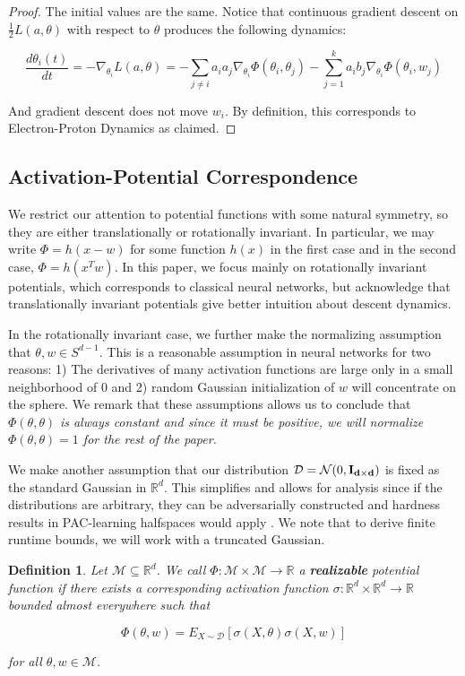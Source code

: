\documentclass[11pt]{article}
\newtheorem{definition}[theorem]{Definition}
\newcommand{\R}{{\mathbb{R}}}
\begin{document}
\begin{proof}
The initial values are the same. Notice that continuous gradient descent on $\frac{1}{2}L(a,\theta)$ with respect to $\theta$ produces the following dynamics:

\[\frac{d\theta_i(t)}{dt} = -\nabla_{\theta_i}L(a,\theta) = -\sum_{j \neq i} a_i a_j \nabla_{\theta_i}\Phi(\theta_i,\theta_j) - \sum_{j=1}^k a_ib_j\nabla_{\theta_i} \Phi(\theta_i,w_j)\]

And gradient descent does not move $w_i$. By definition, this corresponds to Electron-Proton Dynamics as claimed.
\end{proof}

\subsection{Activation-Potential Correspondence}

We restrict our attention to potential functions with some natural symmetry, so they are either translationally or rotationally invariant. In particular, we may write $\Phi= h(x-w)$ for some function $h(x)$  in the first case and in the second case, $\Phi = h(x^Tw)$. In this paper, we focus mainly on rotationally invariant potentials, which corresponds to classical neural networks, but acknowledge that translationally invariant potentials give better intuition about descent dynamics.

In the rotationally invariant case, we further make the normalizing assumption that $\theta, w \in S^{d-1}$. This is a reasonable assumption in neural networks for two reasons: 1) The derivatives of many activation functions are large only in a small neighborhood of 0 and 2) random Gaussian initialization of $w$ will concentrate on the sphere. We remark that these assumptions allows us to conclude that $\Phi(\theta,\theta)$ {\it is always constant and since it must be positive, we will normalize $\Phi(\theta,\theta) = 1$ for the rest of the paper.}

We make another assumption that our distribution $\mathcal{D} = \mathcal{N}(0, {\bf I_{d\times d}})$ is fixed as the standard Gaussian in $\R^d$. This simplifies and allows for analysis since if the distributions are arbitrary, they can be adversarially constructed and hardness results in PAC-learning halfspaces would apply \cite{klivans2006cryptographic}. We note that to derive finite runtime bounds, we will work with a truncated Gaussian.

\begin{definition}
Let $\mathcal{M} \subseteq \R^d$. We call $\Phi: \mathcal{M} \times \mathcal{M} \to \R$ a {\bf realizable} potential function if there exists a corresponding activation function $\sigma:\R^d \times \R^d \to \R$ bounded almost everywhere such that

\[\Phi(\theta,w) = E_{X \sim \mathcal{D}}[\sigma(X,\theta)\sigma(X,w)]\]

for all $\theta, w \in \mathcal{M}$.
\end{definition}
\end{document}
